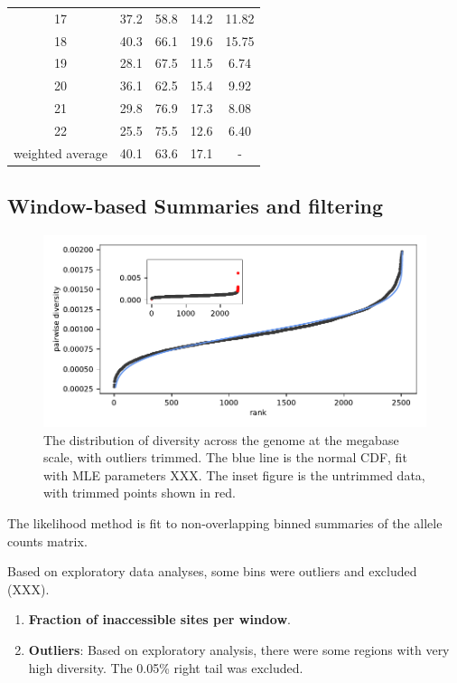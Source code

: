 \documentclass[11pt]{article}
\begin{document}
\begin{table}
\begin{tabular}{|c|cccc|}
17 &        37.2 &     58.8 &  14.2 &     11.82 \\
18 &        40.3 &     66.1 &  19.6 &     15.75 \\
19 &        28.1 &     67.5 &  11.5 &      6.74 \\
20 &        36.1 &     62.5 &  15.4 &      9.92 \\
21 &        29.8 &     76.9 &  17.3 &      8.08 \\
22 &        25.5 &     75.5 &  12.6 &      6.40 \\
\hline
weighted average & 40.1 & 63.6 & 17.1 & - \\
\hline
\end{tabular}
\end{table}

\subsection{Window-based Summaries and filtering}

\begin{figure}[!htb]
  \centering
  \includegraphics{figures/supplementary/diversity_trimming_dist.pdf}

  \caption{The distribution of diversity across the genome at the megabase
  scale, with outliers trimmed. The blue line is the normal CDF, fit with MLE
parameters XXX. The inset figure is the untrimmed data, with trimmed points
shown in red.}
  \label{suppfig:trimming}
\end{figure}


The likelihood method is fit to non-overlapping binned summaries of the allele
counts matrix. 


Based on exploratory data analyses, some bins were outliers and
excluded (XXX). 



\begin{enumerate}
  \item \textbf{Fraction of inaccessible sites per window}.  

  \item \textbf{Outliers}: Based on exploratory analysis, there were some
    regions with very high diversity. The 0.05\% right tail was excluded.

\end{enumerate}
\end{document}
